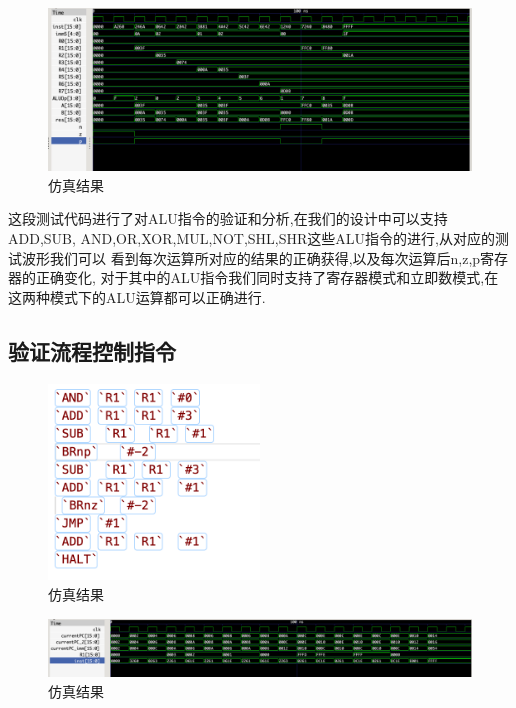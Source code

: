 \documentclass{article}
\begin{document}
        
    
    
    
    \begin{figure}[H]
    \centering
    \includegraphics[width=1.2\textwidth]{pic/4.png}
    \caption{\label{pr}仿真结果}
    \end{figure}
    
这段测试代码进行了对ALU指令的验证和分析,在我们的设计中可以支持ADD,SUB,
AND,OR,XOR,MUL,NOT,SHL,SHR这些ALU指令的进行,从对应的测试波形我们可以
看到每次运算所对应的结果的正确获得,以及每次运算后n,z,p寄存器的正确变化,
对于其中的ALU指令我们同时支持了寄存器模式和立即数模式,在这两种模式下的ALU运算都可以正确进行.



\subsection{验证流程控制指令}

    
    



\begin{figure}[H]
\centering
\includegraphics[width=0.5\textwidth]{pic/6.png}
\caption{\label{pr}仿真结果}
\end{figure}

\begin{figure}[H]
    \centering
    \includegraphics[width=1\textwidth]{pic/5.png}
    \caption{\label{pr}仿真结果}
    \end{figure}
\end{document}
